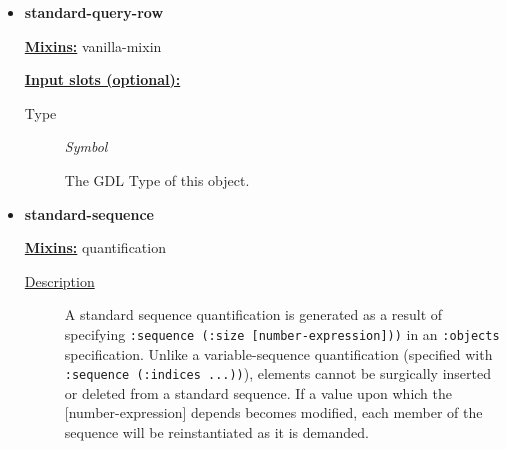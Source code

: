 \documentclass [11pt]{book}
\begin{document}
\begin{itemize}
\begin{description}
\end{description}









\item {}
\label{prim:standard-query-row}
\textbf{standard-query-row}


\textbf{
\underline{Mixins:}} vanilla-mixin





\textbf{
\underline{Input slots (optional):}}

\begin{description}

\item [Type]
\emph{Symbol}

 The GDL Type of this object.




\end{description}







\item {}
\label{prim:standard-sequence}
\textbf{standard-sequence}


\textbf{
\underline{Mixins:}} quantification





\begin{description}

\item [
\underline{Description}]


A standard sequence quantification is generated as a result of specifying 
\texttt{:sequence (:size [number-expression]))} in an \texttt{:objects} specification. Unlike a variable-sequence 
quantification (specified with \texttt{:sequence (:indices ...))}), elements cannot be surgically inserted or 
deleted from a standard sequence. If a value upon which the [number-expression] depends becomes modified,
each member of the sequence will be reinstantiated as it is demanded.



\end{description}









\end{itemize}
\end{document}
